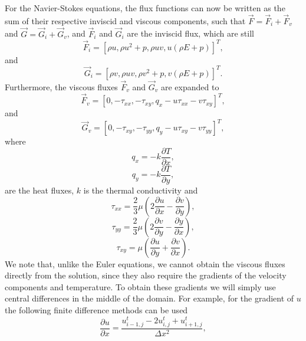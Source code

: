 For the Navier-Stokes equations, the flux functions can now be written as the sum of their respective inviscid and viscous components, such that $\vec{F} = \vec{F}_i + \vec{F}_v$ and $\vec{G} = \vec{G}_i + \vec{G}_v$, and $\vec{F}_i$ and $\vec{G}_i$ are the inviscid flux, which are still
\begin{equation}
	\vec{F}_i = [\rho u,\rho u^2 + p, \rho uv, u(\rho E+p)]^T,
\end{equation}
and
\begin{equation}
	\vec{G}_i = [\rho v,\rho u v, \rho v^2+p, v(\rho E+p)]^T.
\end{equation}
Furthermore, the viscous fluxes $\vec{F}_v$ and $\vec{G}_v$ are expanded to
\begin{equation}
	\vec{F}_v = [0,-\tau_{xx}, -\tau_{xy}, q_x-u\tau_{xx}-v\tau_{xy}]^T,
\end{equation}
and
\begin{equation}
	\vec{G}_v = [0,-\tau_{xy}, -\tau_{yy}, q_y-u\tau_{xy}-v\tau_{yy}]^T,
\end{equation}
where 
\begin{equation}
	q_x = -k \frac{\partial T}{\partial x},
\end{equation} 
\begin{equation}
 q_y = -k \frac{\partial T}{\partial y},
\end{equation} 
are the heat fluxes, $k$ is the thermal conductivity and
\begin{equation}
	\tau_{xx} = \frac{2}{3}\mu\left(2 \frac{\partial u}{\partial x} - \frac{\partial v}{\partial y} \right),
\end{equation}
\begin{equation}
	\tau_{yy} = \frac{2}{3}\mu\left(2 \frac{\partial v}{\partial y} - \frac{\partial y}{\partial x} \right),
\end{equation}
\begin{equation}
	\tau_{xy} = \mu \left(\frac{\partial u}{\partial y} + \frac{\partial v}{\partial x}\right).
\end{equation}
We note that, unlike the Euler equations, we cannot obtain the viscous fluxes directly from the solution, since they also require the gradients of the velocity components and temperature. To obtain these gradients we will simply use central differences in the middle of the domain. For example, for the gradient of $u$ the following finite difference methods can be used
\begin{equation}
	\frac{\partial u}{\partial x} = \frac{u_{i-1,j}^t - 2 u_{i,j}^t + u_{i+1,j}^t}{\Delta x^2},
\end{equation}

